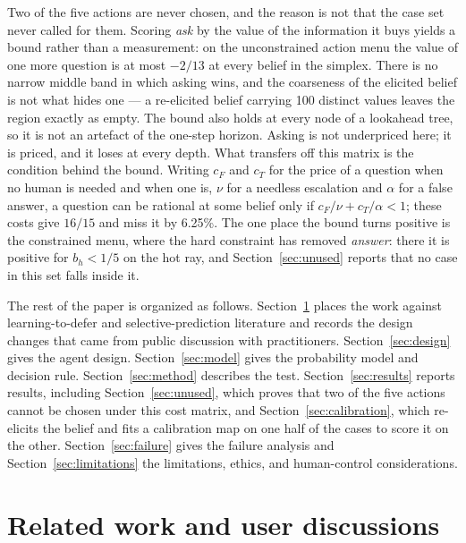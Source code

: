 \documentclass{article}
\begin{document}
Two of the five actions are never chosen, and the reason is not that the case set
never called for them. Scoring \emph{ask} by the value of the information it buys
yields a bound rather than a measurement: on the unconstrained action menu the
value of one more question is at most $-2/13$ at every belief in the simplex.
There is no narrow middle band in which asking wins, and the coarseness of the
elicited belief is not what hides one --- a re-elicited belief carrying 100
distinct values leaves the region exactly as empty. The bound also holds at every
node of a lookahead tree, so it is not an artefact of the one-step horizon.
Asking is not underpriced here; it is priced, and it loses at every depth. What
transfers off this matrix is the condition behind the bound. Writing $c_F$ and
$c_T$ for the price of a question when no human is needed and when one is, $\nu$
for a needless escalation and $\alpha$ for a false answer, a question can be
rational at some belief only if $c_F/\nu + c_T/\alpha < 1$; these costs give
$16/15$ and miss it by 6.25\%. The one place the bound turns positive is the
constrained menu, where the hard constraint has removed \emph{answer}: there it
is positive for $b_h < 1/5$ on the hot ray, and
Section~\ref{sec:unused} reports that no case in this set falls inside it.

The rest of the paper is organized as follows.
Section~\ref{sec:related} places the work against learning-to-defer and
selective-prediction literature and records the design changes that came from
public discussion with practitioners. Section~\ref{sec:design} gives the agent
design. Section~\ref{sec:model} gives the probability model and decision rule.
Section~\ref{sec:method} describes the test. Section~\ref{sec:results} reports
results, including Section~\ref{sec:unused}, which proves that two of the five
actions cannot be chosen under this cost matrix, and
Section~\ref{sec:calibration}, which re-elicits the belief and fits a calibration
map on one half of the cases to score it on the other.
Section~\ref{sec:failure} gives the failure analysis and
Section~\ref{sec:limitations} the limitations, ethics, and human-control
considerations.

\section{Related work and user discussions}
\label{sec:related}
\end{document}
